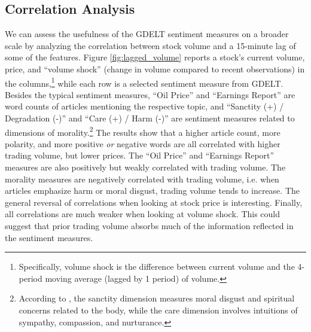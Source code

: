 \documentclass[12pt]{article}
\begin{document}
\subsection{Correlation Analysis}
We can assess the usefulness of the GDELT sentiment measures on a broader scale by analyzing the correlation between stock volume and a 15-minute lag of some of the features. Figure \ref{fig:lagged_volume} reports a stock's current volume, price, and ``volume shock'' (change in volume compared to recent observations) in the columns,\footnote{Specifically, volume shock is the difference between current volume and the 4-period moving average (lagged by 1 period) of volume.}  while each row is a selected sentiment measure from GDELT. Besides the typical sentiment measures, ``Oil Price'' and ``Earnings Report'' are word counts of articles mentioning the respective topic, and ``Sanctity (+) / Degradation (-)'' and ``Care (+) / Harm (-)'' are sentiment measures related to dimensions of morality.\footnote{According to \textcite{hopp2021extended}, the sanctity dimension measures moral disgust and spiritual concerns related to the body, while the care dimension involves intuitions of sympathy, compassion, and nurturance.} The results show that a higher article count, more polarity, and more positive \textit{or} negative words are all correlated with higher trading volume, but lower prices. The ``Oil Price'' and ``Earnings Report'' measures are also positively but weakly correlated with trading volume. The morality measures are negatively correlated with trading volume, i.e. when articles emphasize harm or moral disgust, trading volume tends to increase. The general reversal of correlations when looking at stock price is interesting. Finally, all correlations are much weaker when looking at  volume shock. This could suggest that prior trading volume absorbs much of the information reflected in the sentiment measures.
\end{document}
